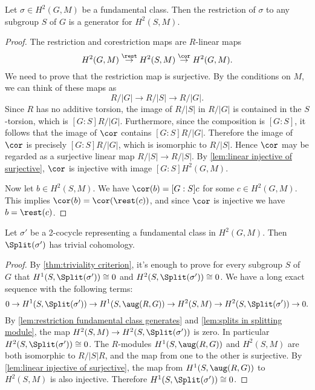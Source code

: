 \begin{lemma} \label{lem:restriction fundamental class generates}
	Let $\sigma \in H^2(G,M)$ be a fundamental class.
	Then the restriction of $\sigma$ to any subgroup $S$ of $G$
	is a generator for $H^2(S,M)$.
\end{lemma}

\begin{proof}
	The restriction and corestriction maps are $R$-linear maps
	\[
		H^2(G,M) \stackrel{\rest}\to H^2(S,M) \stackrel{\cor}\to H^2(G,M).
	\]
	We need to prove that the restriction map is surjective.
	By the conditions on $M$, we can think of these maps as
	\[
		R / |G| \to R / |S| \to R / |G|.
	\]
	Since $R$ has no additive torsion, the image of $R/|S|$ in $R/|G|$
	is contained in the $S$-torsion, which is $[G:S] R / |G|$.
	Furthermore, since the composition is $[G:S]$,
	it follows that the image of $\cor$ contains $[G:S] R / |G|$.
	Therefore the image of $\cor$ is precisely $[G:S] R / |G|$, which
	is isomorphic to $R/|S|$. Hence $\cor$ may be regarded as a surjective linear map
	$R/|S| \to R/|S|$.
	By \ref{lem:linear injective of surjective}, $\cor$ is injective with image
	$[G:S] H^2(G,M)$.

	Now let $b \in H^2(S,M)$. We have $\cor(b) = [G:S]c$ for some $c \in H^2(G,M)$.
	This implies $\cor(b) = \cor (\rest( c))$, and since $\cor$ is injective we have
	$b = \rest(c)$.
\end{proof}

\begin{theorem} \label{thm:splitting module trivial}
	Let $\sigma'$ be a 2-cocycle representing a fundamental class in $H^2(G,M)$.
	Then $\Split(\sigma')$ has trivial cohomology.
\end{theorem}

\begin{proof}
	By \ref{thm:triviality criterion}, it's enough to prove for every subgroup $S$ of $G$ that
	$H^1(S,\Split(\sigma')) \cong 0$ and $H^2(S,\Split(\sigma')) \cong 0$.
	We have a long exact sequence with the following terms:
	\[
		0 \to H^1(S,\Split(\sigma')) \to H^1(S,\aug(R,G)) \to H^2(S,M) \to H^2(S,\Split(\sigma'))
		\to 0.
	\]
	By \ref{lem:restriction fundamental class generates} and \ref{lem:splits in splitting module},
	the map $H^2(S,M) \to H^2(S,\Split(\sigma'))$ is zero.
	In particular $H^2(S,\Split(\sigma')) \cong 0$.
	The $R$-modules $H^1(S,\aug(R,G))$ and $H^2(S,M)$ are both isomorphic to $R / |S|R$,
	and the map from one to the other is surjective.
	By \ref{lem:linear injective of surjective}, the map
	from $H^1(S,\aug(R,G))$ to $H^2(S,M)$ is also injective.
	Therefore $H^1(S,\Split(\sigma')) \cong 0$.
\end{proof}

